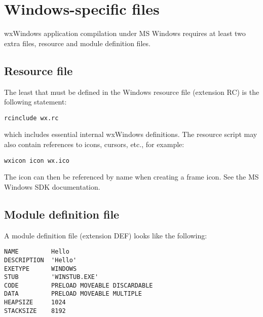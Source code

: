 
\section{Windows-specific files}

wxWindows application compilation under MS Windows requires at least two
extra files, resource and module definition files.

\subsection{Resource file}\label{resources}

The least that must be defined in the Windows resource file (extension RC)
is the following statement:

\begin{verbatim}
rcinclude wx.rc
\end{verbatim}

which includes essential internal wxWindows definitions.  The resource script
may also contain references to icons, cursors, etc., for example:

\begin{verbatim}
wxicon icon wx.ico
\end{verbatim}

The icon can then be referenced by name when creating a frame icon. See
the MS Windows SDK documentation.


\subsection{Module definition file}

A module definition file (extension DEF) looks like the following:

\begin{verbatim}
NAME         Hello
DESCRIPTION  'Hello'
EXETYPE      WINDOWS
STUB         'WINSTUB.EXE'
CODE         PRELOAD MOVEABLE DISCARDABLE
DATA         PRELOAD MOVEABLE MULTIPLE
HEAPSIZE     1024
STACKSIZE    8192
\end{verbatim}


